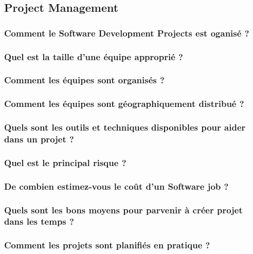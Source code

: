\subsection{Project Management}



\subsubsection{Comment le Software Development Projects est oganisé ?}



\subsubsection{Quel est la taille d'une équipe approprié ?}



\subsubsection{Comment les équipes sont organisés ?}



\subsubsection{Comment les équipes sont géographiquement distribué ?}



\subsubsection{Quels sont les outils et techniques disponibles pour aider dans un projet ?}



\subsubsection{Quel est le principal risque ?}



\subsubsection{De combien estimez-vous le coût d'un Software job ?}



\subsubsection{Quels sont les bons moyens pour parvenir à créer projet dans les temps ?}



\subsubsection{Comment les projets sont planifiés en pratique ?}